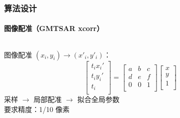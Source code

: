 \documentclass{beamer}
\begin{document}
\begin{frame}
    \frametitle{算法设计}
    \framesubtitle{图像配准（GMTSAR xcorr）}

    \begin{columns}
        \begin{column}{0.5\textwidth}
            \footnotesize
            \begin{center}
                图像配准 $(x_i, y_i) \to (x'_i, y'_i)$：
                \begin{equation*}
                    \begin{bmatrix}
                        t_i x_i' \\
                        t_i y_i' \\
                        t_i \\
                    \end{bmatrix}
                    = \begin{bmatrix}
                        a & b & c \\
                        d & e & f \\
                        0 & 0 & 1 \\
                    \end{bmatrix}
                    \begin{bmatrix}
                        x \\
                        y \\
                        1 \\
                    \end{bmatrix}
                \end{equation*}
                采样 $\to$ 局部配准 $\to$ 拟合全局参数\\
                要求精度：1/10 像素
            \end{center}


\end{column}
\end{columns}
\end{frame}
\end{document}

